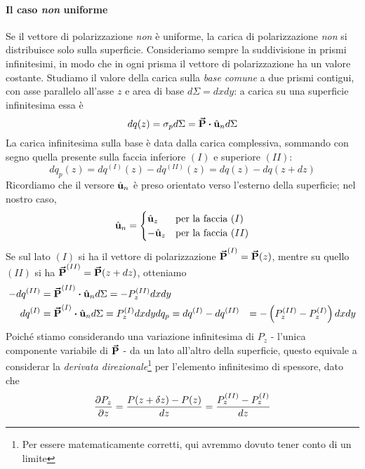 \paragraph{Il caso \textit{non} uniforme}
Se il vettore di polarizzazione \textit{non} è uniforme, la carica di polarizzazione \textit{non} si distribuisce solo sulla superficie. Consideriamo sempre la suddivisione in prismi infinitesimi, in modo che in ogni prisma il vettore di polarizzazione ha un valore costante. Studiamo il valore della carica sulla \textit{base comune} a due prismi contigui, con asse parallelo all'asse $z$ e area di base $d\Sigma=dxdy$: a carica su una superficie infinitesima essa è
\begin{equation*}
	dq(z)=\sigma_pd\Sigma=\vba{P}\vdot \vbh{u}_nd\Sigma
\end{equation*}
La carica infinitesima sulla base è data dalla carica complessiva, sommando con segno quella presente sulla faccia inferiore $(I)$ e superiore $(II)$:
\begin{equation*}
	dq_{p}(z)=dq^{(I)}(z)-dq^{(II)}(z)=dq(z)-dq(z+dz)
\end{equation*}
Ricordiamo che il versore $\hat{\mathbf{u}}_n$ è preso orientato verso l'esterno della superficie; nel nostro caso,
\begin{equation*}
	\hat{\mathbf{u}}_n=\begin{cases}
		\hat{\mathbf{u}}_z&\text{per la faccia}\ (I)\\
		-\hat{\mathbf{u}}_z&\text{per la faccia}\ (II)\\
	\end{cases}
\end{equation*}
Se sul lato $(I)$ si ha il vettore di polarizzazione $\vb*{\va{P}}^{(I)}=\vb*{\va{P}}(z)$, mentre su quello $(II)$ si ha $\vb*{\va{P}}^{(II)}=\vb*{\va{P}}(z+dz)$, otteniamo
\begin{align*}
	-dq^{(II)}&=\vba{P}^{(II)}\vdot \vbh{u}_nd\Sigma=-P^{(II)}_z dxdy\\
	dq^{(I)}&=\vba{P}^{(I)}\vdot \vbh{u}_nd\Sigma=P^{(I)}_z dxdy
	dq_{p}=dq^{(I)}-dq^{(II)}&=-\left(P^{(II)}_z-P^{(I)}_z\right) dxdy
\end{align*}
Poiché stiamo considerando una variazione infinitesima di $P_z$ - l'unica componente variabile di $\vb*{\va{P}}$ - da un lato all'altro della superficie, questo equivale a considerar la \textit{derivata direzionale}\footnote{Per essere matematicamente corretti, qui avremmo dovuto tener conto di un limite} per l'elemento infinitesimo di spessore, dato che
\begin{equation*}
	\pdv{P_z}{z}=\frac{P(z+\delta z)-P(z)}{dz}=\frac{P^{(II)}_z-P^{(I)}_z}{dz}
\end{equation*}
